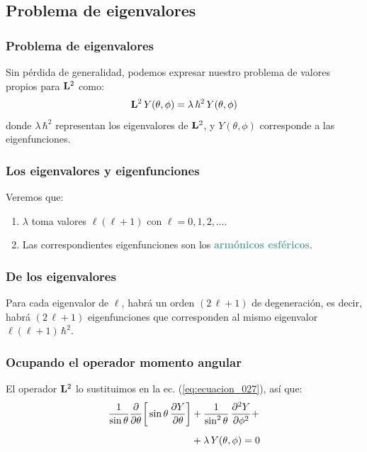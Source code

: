 \documentclass[12pt]{beamer}
\begin{document}
\subsection{Problema de eigenvalores}

\begin{frame}
\frametitle{Problema de eigenvalores}
Sin pérdida de generalidad, podemos expresar nuestro problema de valores propios para $\vb{L}^{2}$ como:
\pause
\begin{align}
\vb{L}^{2} \, Y(\theta, \phi) = \lambda \, \hbar^{2} \, Y(\theta, \phi)
\label{eq:ecuacion_027}
\end{align}
\pause
donde $\lambda \, \hbar^{2}$ representan los eigenvalores de $\vb{L}^{2}$, \pause y $Y(\theta, \phi)$ corresponde a las eigenfunciones. 
\end{frame}
\begin{frame}
\frametitle{Los eigenvalores y eigenfunciones}
Veremos que:
\pause
{}
\begin{enumerate}[<+->]
\item $\lambda$ toma valores $\ell (\ell + 1)$ con $\ell = 0, 1, 2, \ldots$.
\item Las correspondientes eigenfunciones son los \textbf{\textcolor{cadetblue}{armónicos esféricos}}.
\end{enumerate}
\end{frame}
\begin{frame}
\frametitle{De los eigenvalores}
Para cada eigenvalor de $\ell$, habrá un orden $(2 \, \ell + 1)$ de degeneración, \pause es decir, habrá $(2 \, \ell + 1)$ eigenfunciones que corresponden al mismo eigenvalor $\ell (\ell + 1) \, \hbar^{2}$.
\end{frame}
\begin{frame}
\frametitle{Ocupando el operador momento angular}
El operador $\vb{L}^{2}$ lo sustituimos en la ec. (\ref{eq:ecuacion_027}), así que:
\pause
\begin{align}
\begin{aligned}
\dfrac{1}{\sin \theta} \pdv{\theta} \bigg[ \sin \theta \, \pdv{Y}{\theta} \bigg] &+ \dfrac{1}{\sin^{2} \theta} \, \pdv[2]{Y}{\phi} + \\[0.5em]
&+ \lambda \, Y(\theta, \phi) = 0
\end{aligned}
\end{align}
\end{frame}
\end{document}
